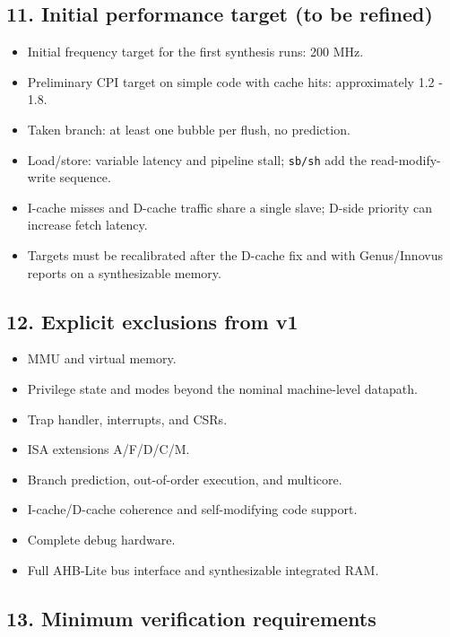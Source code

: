 \documentclass[]{article}
\providecommand{\tightlist}{%
  \setlength{\itemsep}{0pt}\setlength{\parskip}{0pt}}
\begin{document}
\hypertarget{11-initial-performance-target-to-be-refined}{%
\subsection{11. Initial performance target (to be
refined)}\label{11-initial-performance-target-to-be-refined}}

\begin{itemize}
\tightlist
\item
  Initial frequency target for the first synthesis runs: 200 MHz.
\item
  Preliminary CPI target on simple code with cache hits: approximately
  1.2 - 1.8.
\item
  Taken branch: at least one bubble per flush, no prediction.
\item
  Load/store: variable latency and pipeline stall; \texttt{sb/sh} add
  the read-modify-write sequence.
\item
  I-cache misses and D-cache traffic share a single slave; D-side
  priority can increase fetch latency.
\item
  Targets must be recalibrated after the D-cache fix and with
  Genus/Innovus reports on a synthesizable memory.
\end{itemize}

\hypertarget{12-explicit-exclusions-from-v1}{%
\subsection{12. Explicit exclusions from
v1}\label{12-explicit-exclusions-from-v1}}

\begin{itemize}
\tightlist
\item
  MMU and virtual memory.
\item
  Privilege state and modes beyond the nominal machine-level datapath.
\item
  Trap handler, interrupts, and CSRs.
\item
  ISA extensions A/F/D/C/M.
\item
  Branch prediction, out-of-order execution, and multicore.
\item
  I-cache/D-cache coherence and self-modifying code support.
\item
  Complete debug hardware.
\item
  Full AHB-Lite bus interface and synthesizable integrated RAM.
\end{itemize}

\hypertarget{13-minimum-verification-requirements}{%
\subsection{13. Minimum verification
requirements}\label{13-minimum-verification-requirements}}
\end{document}
